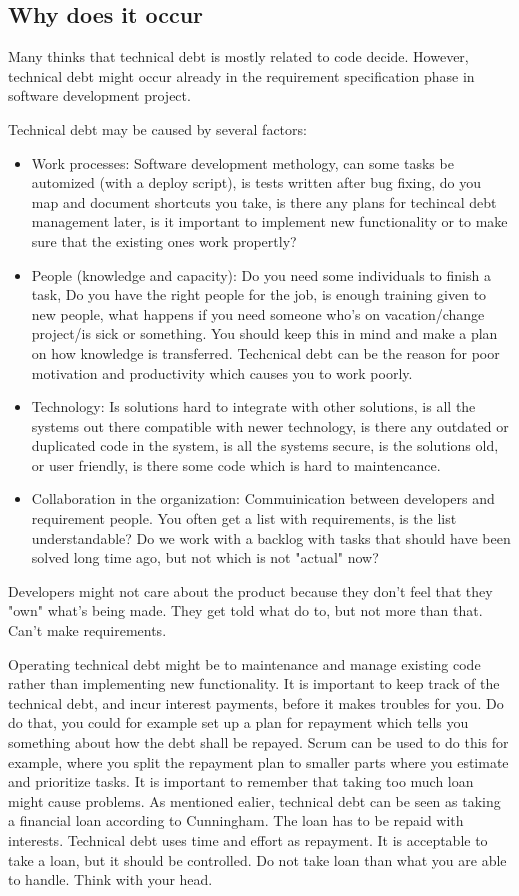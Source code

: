 \subsection{Why does it occur}
Many thinks that technical debt is mostly related to code decide. However, technical debt might occur already in the requirement specification phase in software development project. 

Technical debt may be caused by several factors:
\begin{itemize}
	\item Work processes: Software development methology, can some tasks be automized (with a deploy script), is tests written after bug fixing, do you map and document shortcuts you take, is there any plans for techincal debt management later, is it important to implement new functionality or to make sure that the existing ones work propertly?
	\item People (knowledge and capacity): Do you need some individuals to finish a task, Do you have the right people for the job, is enough training given to new people, what happens if you need someone who's on vacation/change project/is sick or something. You should keep this in mind and make a plan on how knowledge is transferred. Techcnical debt can be the reason for poor motivation and productivity which causes you to work poorly. 
	\item Technology: Is solutions hard to integrate with other solutions, is all the systems out there compatible with newer technology, is there any outdated or duplicated code in the system, is all the systems secure, is the solutions old, or user friendly, is there some code which is hard to maintencance. 
	\item Collaboration in the organization: Commuinication between developers and requirement people. You often get a list with requirements, is the list understandable? Do we work with a backlog with tasks that should have been solved long time ago, but not which is not "actual" now?
\end{itemize}
Developers might not care about the product because they don't feel that they "own" what's being made. They get told what do to, but not more than that. Can't make requirements.


Operating technical debt might be to maintenance and manage existing code rather than implementing new functionality. It is important to keep track of the technical debt, and incur interest payments, before it makes troubles for you. Do do that, you could for example set up a plan for repayment which tells you something about how the debt shall be repayed. Scrum can be used to do this for example, where you split the repayment plan to smaller parts where you estimate and prioritize tasks. It is important to remember that taking too much loan might cause problems. As mentioned ealier, technical debt can be seen as taking a financial loan according to Cunningham. The loan has to be repaid with interests. Technical debt uses time and effort as repayment. It is acceptable to take a loan, but it should be controlled. Do not take loan than what you are able to handle. Think with your head.


